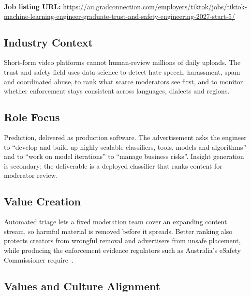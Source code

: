 \textbf{Job listing URL:} \url{https://au.gradconnection.com/employers/tiktok/jobs/tiktok-machine-learning-engineer-graduate-trust-and-safety-engineering-2027-start-5/}

\subsection{Industry Context}
\label{subsec:Industry Context}

Short-form video platforms cannot human-review millions of daily uploads. The trust and
safety field uses data science to detect hate speech, harassment, spam and coordinated
abuse, to rank what scarce moderators see first, and to monitor whether enforcement stays
consistent across languages, dialects and regions.


\subsection{Role Focus}
\label{subsec:Role Focus}

Prediction, delivered as production software. The advertisement asks the engineer to
``develop and build up highly-scalable classifiers, tools, models and algorithms'' and to
``work on model iterations'' to ``manage business risks''. Insight generation is
secondary; the deliverable is a deployed classifier that ranks content for moderator
review.


\subsection{Value Creation}
\label{subsec:Value Creation}

Automated triage lets a fixed moderation team cover an expanding content stream, so
harmful material is removed before it spreads. Better ranking also protects creators from
wrongful removal and advertisers from unsafe placement, while producing the enforcement
evidence regulators such as Australia's eSafety Commissioner require~\cite{esafety2022bosa}.


\subsection{Values and Culture Alignment}
\label{subsec:Values and Culture Alignment}

